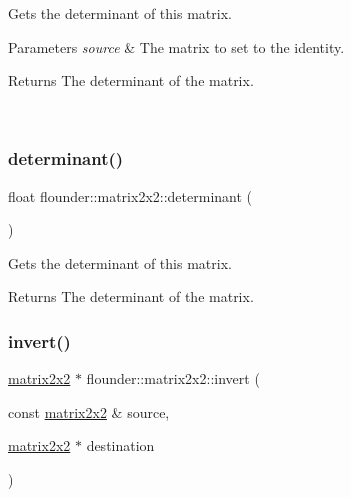 Gets the determinant of this matrix. 


\begin{DoxyParams}{Parameters}
{\em source} & The matrix to set to the identity. \begin{DoxyReturn}{Returns}
The determinant of the matrix. 
\end{DoxyReturn}
\\
\hline
\end{DoxyParams}
\mbox{\label{classflounder_1_1matrix2x2_aba728cb860075c19d7776b460d20bff7}} 
\subsubsection{\texorpdfstring{determinant()}{determinant()}\hspace{0.1cm}{\footnotesize\ttfamily [2/2]}}
{\footnotesize\ttfamily float flounder\+::matrix2x2\+::determinant (\begin{DoxyParamCaption}{ }\end{DoxyParamCaption})}



Gets the determinant of this matrix. 

\begin{DoxyReturn}{Returns}
The determinant of the matrix. 
\end{DoxyReturn}
\mbox{\label{classflounder_1_1matrix2x2_ae436586adaec6b5b47a2480e1162c25e}} 
\subsubsection{\texorpdfstring{invert()}{invert()}\hspace{0.1cm}{\footnotesize\ttfamily [1/2]}}
{\footnotesize\ttfamily \hyperlink{classflounder_1_1matrix2x2}{matrix2x2} $\ast$ flounder\+::matrix2x2\+::invert (\begin{DoxyParamCaption}\item[{const \hyperlink{classflounder_1_1matrix2x2}{matrix2x2} \&}]{source,  }\item[{\hyperlink{classflounder_1_1matrix2x2}{matrix2x2} $\ast$}]{destination }\end{DoxyParamCaption})\hspace{0.3cm}{\ttfamily [static]}}



